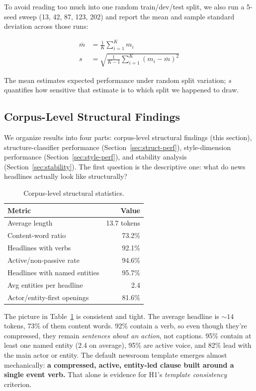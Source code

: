 \documentclass[11pt]{article}
\begin{document}
To avoid reading too much into one random train/dev/test split, we also run a 5-seed sweep (13, 42, 87, 123, 202) and report the mean and sample standard deviation across those runs:

\begin{align*}
\overline{m} &= \tfrac{1}{K} \sum_{i=1}^{K} m_{i} \\[2pt]
s &= \sqrt{\tfrac{1}{K-1} \sum_{i=1}^{K} (m_{i} - \overline{m})^{2}}
\end{align*}

The mean estimates expected performance under random split variation; $s$ quantifies how sensitive that estimate is to which split we happened to draw.

\subsection{Corpus-Level Structural Findings}
\label{sec:corpus}
We organize results into four parts: corpus-level structural findings (this section), structure-classifier performance (Section~\ref{sec:struct-perf}), style-dimension performance (Section~\ref{sec:style-perf}), and stability analysis (Section~\ref{sec:stability}). The first question is the descriptive one: what do news headlines actually look like structurally?

\begin{table}[h]
\centering
\small
\begin{tabular}{lr}
\toprule
\textbf{Metric} & \textbf{Value} \\
\midrule
Average length & 13.7 tokens \\
Content-word ratio & 73.2\% \\
Headlines with verbs & 92.1\% \\
Active/non-passive rate & 94.6\% \\
Headlines with named entities & 95.7\% \\
Avg entities per headline & 2.4 \\
Actor/entity-first openings & 81.6\% \\
\bottomrule
\end{tabular}
\caption{Corpus-level structural statistics.}
\label{tab:corpus}
\end{table}

The picture in Table~\ref{tab:corpus} is consistent and tight. The average headline is $\sim 14$ tokens, 73\% of them content words. 92\% contain a verb, so even though they're compressed, they remain \emph{sentences about an action}, not captions. 95\% contain at least one named entity (2.4 on average), 95\% are active voice, and 82\% lead with the main actor or entity. The default newsroom template emerges almost mechanically: \textbf{a compressed, active, entity-led clause built around a single event verb.} That alone is evidence for H1's \emph{template consistency} criterion.
\end{document}
